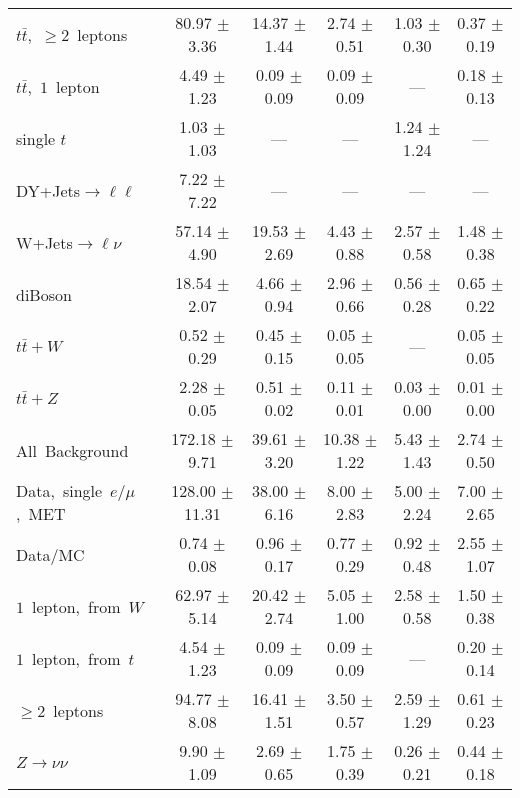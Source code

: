 \documentclass{article}
\begin{document}
\begin{longtable}{|l|c|c|c|c|c|}
$t\bar{t}$,~$\ge2$~leptons & 80.97 $\pm$ 3.36  & 14.37 $\pm$ 1.44  & 2.74 $\pm$ 0.51  & 1.03 $\pm$ 0.30  & 0.37 $\pm$ 0.19 \\* 
$t\bar{t}$,~$1$~lepton & 4.49 $\pm$ 1.23  & 0.09 $\pm$ 0.09  & 0.09 $\pm$ 0.09  & ---  & 0.18 $\pm$ 0.13 \\* 
single $t$  & 1.03 $\pm$ 1.03  & ---  & ---  & 1.24 $\pm$ 1.24  & --- \\* 
DY+Jets$\rightarrow\ell\ell$  & 7.22 $\pm$ 7.22  & ---  & ---  & ---  & --- \\* 
W+Jets$\rightarrow\ell\nu$  & 57.14 $\pm$ 4.90  & 19.53 $\pm$ 2.69  & 4.43 $\pm$ 0.88  & 2.57 $\pm$ 0.58  & 1.48 $\pm$ 0.38 \\* 
diBoson  & 18.54 $\pm$ 2.07  & 4.66 $\pm$ 0.94  & 2.96 $\pm$ 0.66  & 0.56 $\pm$ 0.28  & 0.65 $\pm$ 0.22 \\* 
$t\bar{t}+W$  & 0.52 $\pm$ 0.29  & 0.45 $\pm$ 0.15  & 0.05 $\pm$ 0.05  & ---  & 0.05 $\pm$ 0.05 \\* 
$t\bar{t}+Z$  & 2.28 $\pm$ 0.05  & 0.51 $\pm$ 0.02  & 0.11 $\pm$ 0.01  & 0.03 $\pm$ 0.00  & 0.01 $\pm$ 0.00 \\* 
\hline \hline 
All~Background  & 172.18 $\pm$ 9.71  & 39.61 $\pm$ 3.20  & 10.38 $\pm$ 1.22  & 5.43 $\pm$ 1.43  & 2.74 $\pm$ 0.50 \\* 
Data,~single~$e/\mu$,~MET  & 128.00 $\pm$ 11.31  & 38.00 $\pm$ 6.16  & 8.00 $\pm$ 2.83  & 5.00 $\pm$ 2.24  & 7.00 $\pm$ 2.65 \\* 
Data/MC  & 0.74 $\pm$ 0.08  & 0.96 $\pm$ 0.17  & 0.77 $\pm$ 0.29  & 0.92 $\pm$ 0.48  & 2.55 $\pm$ 1.07 \\* 
\hline \hline 
$1$~lepton,~from~$W$  & 62.97 $\pm$ 5.14  & 20.42 $\pm$ 2.74  & 5.05 $\pm$ 1.00  & 2.58 $\pm$ 0.58  & 1.50 $\pm$ 0.38 \\* 
$1$~lepton,~from~$t$  & 4.54 $\pm$ 1.23  & 0.09 $\pm$ 0.09  & 0.09 $\pm$ 0.09  & ---  & 0.20 $\pm$ 0.14 \\* 
$\ge2$~leptons  & 94.77 $\pm$ 8.08  & 16.41 $\pm$ 1.51  & 3.50 $\pm$ 0.57  & 2.59 $\pm$ 1.29  & 0.61 $\pm$ 0.23 \\* 
$Z\rightarrow\nu\nu$  & 9.90 $\pm$ 1.09  & 2.69 $\pm$ 0.65  & 1.75 $\pm$ 0.39  & 0.26 $\pm$ 0.21  & 0.44 $\pm$ 0.18 \\* 
\hline 
\end{longtable} 

 
 
 
 
\pagebreak 

 
 
 
 
\end{document}
